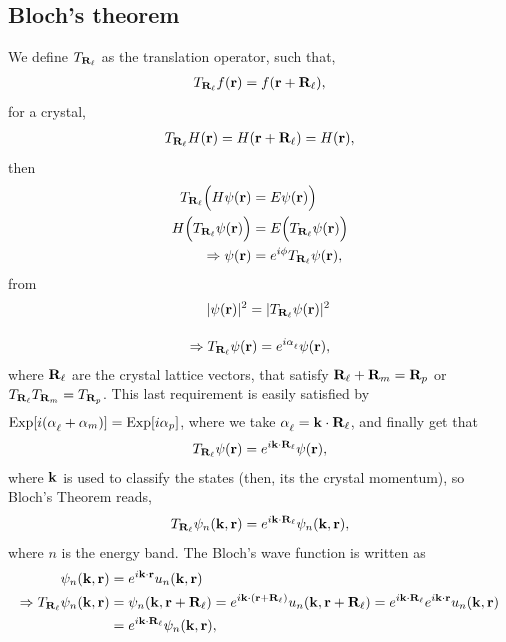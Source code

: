 \documentclass[floatfix,prb,aps,superscriptaddress,11pt]{revtex4}
\begin{document}
\subsection{Bloch's theorem}

We define $T_{\mathbf{R}_\ell}$ as the translation operator, such that,
\begin{align}\label{ee.1} 
T_{\mathbf{R}_\ell}f(\mathbf{r})=f(\mathbf{r}+\mathbf{R}_\ell)  
,
\end{align} 
for a crystal,
\begin{align}\label{ee.2} 
T_{\mathbf{R}_\ell}H(\mathbf{r})=H(\mathbf{r}+\mathbf{R}_\ell) =H(\mathbf{r}) 
,
\end{align} 
then
\begin{align}\label{ee.2n}
T_{\mathbf{R}_\ell}\Big(H\psi(\mathbf{r})&=E\psi(\mathbf{r})\Big) 
\nonumber\\ 
H \Big(T_{\mathbf{R}_\ell}\psi(\mathbf{r})\Big)&=E \Big(T_{\mathbf{R}_\ell}\psi(\mathbf{r})\Big) 
\nonumber\\
\Rightarrow \psi(\mathbf{r})&=e^{i\phi}T_{\mathbf{R}_\ell}\psi(\mathbf{r})
,
\end{align}
from
\begin{align}\label{ee.3}
|\psi(\mathbf{r})|^2=|T_{\mathbf{R}_\ell}\psi(\mathbf{r})|^2
\nonumber\\
\Rightarrow T_{\mathbf{R}_\ell}
\psi(\mathbf{r})=e^{i\alpha^{\strut}_\ell}
\psi(\mathbf{r})
,
\end{align}
where $\mathbf{R}_\ell$ 
are the crystal lattice vectors, that satisfy 
$\mathbf{R}_\ell+\mathbf{R}_m=\mathbf{R}_p$ or
$T_{\mathbf{R}_\ell}T_{\mathbf{R}_m}=T_{\mathbf{R}_p}$. 
This last requirement is easily satisfied by
$\mathrm{Exp}[i(\alpha^{\strut}_\ell
+\alpha^{\strut}_m)]=\mathrm{Exp}[i\alpha^{\strut}_p]$, where we take
$\alpha^{\strut}_\ell=\mathbf{k}\cdot\mathbf{R}_\ell$, 
and finally get that
\begin{align}\label{ee.4} 
T_{\mathbf{R}_\ell}\psi(\mathbf{r})=e^{i \mathbf{k}\cdot\mathbf{R}_\ell}\psi(\mathbf{r})  
,
\end{align}    
where $\mathbf{k}$ is used to classify the states (then, its the crystal
momentum), so Bloch's Theorem reads,
\begin{align}\label{ee.5} 
T_{\mathbf{R}_\ell}\psi_n(\mathbf{k},\mathbf{r})=e^{i \mathbf{k}\cdot\mathbf{R}_\ell}\psi_n(\mathbf{k},\mathbf{r}) 
,
\end{align}    
where $n$ is the energy band. The Bloch's wave function is written as
\begin{align}\label{ee.6}
\psi_n(\mathbf{k},\mathbf{r})&=e^{i \mathbf{k}\cdot\mathbf{r}}u_n(\mathbf{k},\mathbf{r})  
\nonumber\\ 
\Rightarrow T_{\mathbf{R}_\ell}\psi_n(\mathbf{k},\mathbf{r})&=\psi_n(\mathbf{k},\mathbf{r}+\mathbf{R}_\ell)  
= 
e^{i \mathbf{k}\cdot(\mathbf{r}+\mathbf{R}_\ell)}u_n(\mathbf{k},\mathbf{r}+\mathbf{R}_\ell) 
= 
e^{i \mathbf{k}\cdot\mathbf{R}_\ell}   
e^{i \mathbf{k}\cdot\mathbf{r}}  
u_n(\mathbf{k},\mathbf{r}) 
\nonumber\\
&=e^{i \mathbf{k}\cdot\mathbf{R}_\ell} 
\psi_n(\mathbf{k},\mathbf{r})  
,
\end{align}    
\end{document}
